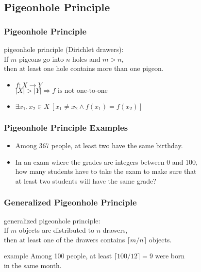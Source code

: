 \documentclass[dvipsnames]{beamer}
\begin{document}
\subsection{Pigeonhole Principle}

\begin{frame}
  \frametitle{Pigeonhole Principle}

  \begin{definition}
    \alert{pigeonhole principle} (Dirichlet drawers):\\
    If $m$ pigeons go into $n$ holes and $m>n$,\\
    then at least one hole contains more than one pigeon.
  \end{definition}

  \pause
  \begin{itemize}
    \item $f: X \rightarrow Y$\\
      $|X|>|Y| \Rightarrow f \mbox{ is not one-to-one}$

    \item $\exists x_1,x_2 \in X~[x_1 \neq x_2 \wedge f(x_1)=f(x_2)]$
  \end{itemize}
\end{frame}

\begin{frame}
  \frametitle{Pigeonhole Principle Examples}

  \begin{itemize}
    \item Among 367 people, at least two have the same birthday.

    \pause
    \medskip
    \item In an exam where the grades are integers between 0 and 100,\\
      how many students have to take the exam to make sure that\\
      at least two students will have the same grade?
  \end{itemize}
\end{frame}

\begin{frame}
  \frametitle{Generalized Pigeonhole Principle}

  \begin{definition}
    \alert{generalized pigeonhole principle}:\\
    If $m$ objects are distributed to $n$ drawers,\\
    then at least one of the drawers contains $\lceil m / n \rceil$ objects.
  \end{definition}

  \pause
  \medskip
  \begin{exampleblock}{example}
    Among 100 people, at least $\lceil 100 / 12 \rceil = 9$ were born\\
    in the same month.
  \end{exampleblock}
\end{frame}
\end{document}
